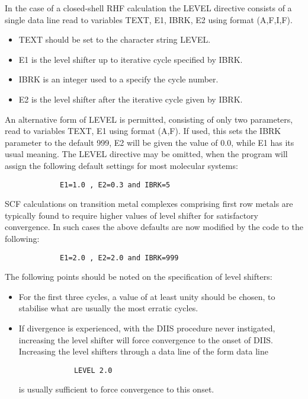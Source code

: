 \documentclass[11pt,fleqn]{article}
\begin{document}
In the case of a closed-shell RHF calculation 
the LEVEL directive consists of a single  data line 
read to variables TEXT, E1, IBRK, E2 using format (A,F,I,F).
\begin{itemize}
\item TEXT should be set to the character string LEVEL.
\item  E1 is the level shifter up to iterative cycle specified by IBRK.
\item  IBRK is an integer used to a specify the cycle number.
\item  E2 is the level shifter after the iterative cycle given by IBRK.
\end{itemize}
An alternative form of LEVEL is permitted, consisting of only two
parameters, read to variables TEXT, E1 using format (A,F). If used,
this sets the IBRK parameter to the default 999,  E2 will be given
the  value of 0.0, while  E1 has its usual meaning.
The LEVEL directive may be omitted, when the program will assign the
following default settings for most molecular systems:

{
\footnotesize
\begin{verbatim}
             E1=1.0 , E2=0.3 and IBRK=5
\end{verbatim}
}
SCF calculations on transition metal complexes comprising first
row metals are typically found to require higher values of
level shifter for satisfactory convergence. In such cases the
above defaults are now modified by the code to the following:

{
\footnotesize
\begin{verbatim}
             E1=2.0 , E2=2.0 and IBRK=999
\end{verbatim}
}
The following points should be noted on the specification
of level shifters:
\begin{itemize}
\item For the first three cycles, a value of at least unity should be
chosen, to stabilise what are usually the most erratic cycles.
\item If divergence is experienced, with the DIIS procedure
never instigated, increasing the level shifter will
force convergence to the onset of DIIS.
Increasing the level shifters through a data line of the form
data line

{
\footnotesize
\begin{verbatim}
             LEVEL 2.0
\end{verbatim}
}
is usually sufficient to force convergence to this onset.
\end{itemize}
\end{document}
